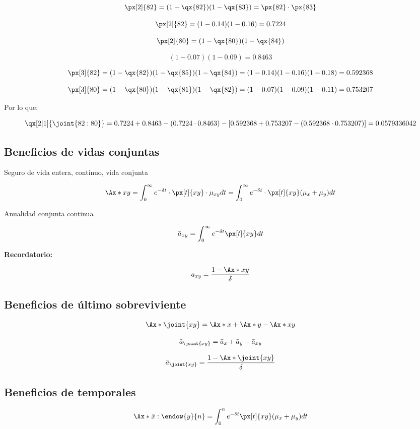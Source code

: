 \documentclass[12pt, a4paper, footinclude=true]{scrbook}
\begin{document}
$$\px[2]{82} = (1 - \qx{82}) (1- \qx{83}) = \px{82} \cdot \px{83}$$

$$\px[2]{82} = (1 - 0{.}14) (1 - 0{.}16) = 0{.}7224$$

$$\px[2]{80} = (1 - \qx{80}) (1 - \qx{84})$$

$$(1- 0{.}07)(1 - 0{.}09) = 0{.}8463$$

$$\px[3]{82} = (1 - \qx{82})(1 - \qx{85})(1 - \qx{84}) = (1 - 0{.}14) ( 1 - 0{.}16) ( 1 - 0{.}18) = 0{.}592368$$

$$\px[3]{80} = (1 - \qx{80}) (1 - \qx{81}) (1 - \qx{82}) = (1 - 0{.}07) (1 - 0{.}09) ( 1 - 0{.}11) = 0{.}753207$$

Por lo que: 

$$\qx[2|1]{\joint{82:80}} = 0{.}7224 + 0{.}8463 - (0{.}7224 \cdot 0{.}8463) - [0{.}592368 + 0{.}753207 - (0{.}592368 \cdot 0{.}753207)] = 0{.}0579336042$$

\subsection{Beneficios de vidas conjuntas}

Seguro de vida entera, continuo, vida conjunta

$$\Ax*{xy} = \int_{0}^{\infty} e^{-\delta t} \cdot \px[t]{xy}  \cdot \mu_{xy} dt = \int_{0}^{\infty} e^{-\delta t} \cdot \px[t]{xy} (\mu_x + \mu_y) dt$$

Anualidad conjunta continua

$$\bar{a}_{xy} = \int_0 ^{\infty} e ^{- \delta t} \px[t]{xy} dt$$

\textbf{Recordatorio:} 

$$a_{xy} = \frac{1 - \Ax*{xy}}{\delta}$$

\subsection{Beneficios de último sobreviviente} 

$$\Ax*{\joint{xy}} = \Ax*{x} + \Ax*{y} - \Ax*{xy}$$

$$\bar{a}_{\joint{xy}} = \bar{a}_x + \bar{a}_y - \bar{a}_{xy}$$

$$\bar{a}_{\joint{xy}} = \frac{1 - \Ax*{\joint{xy}}}{\delta}$$

\subsection{Beneficios de temporales} 

$$\Ax*{\tilde{x}:\endow{y}{n}} = \int_0 ^n e^{- \delta t} \px[t]{xy} (\mu_x + \mu_y) dt$$
\end{document}
